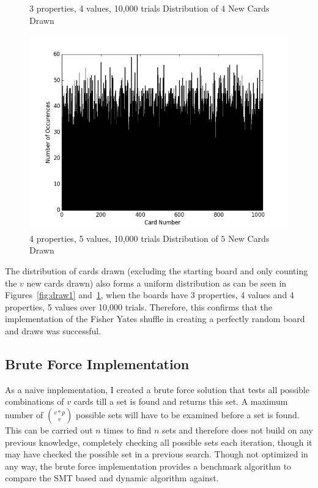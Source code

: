 \documentclass[pageno]{jpaper}
\begin{document}
\begin{figure}[htbb]
\begin{minipage}[b]{0.5\linewidth}
\caption{3 properties, 4 values, 10,000 trials Distribution of $4$ New Cards Drawn}
\label{fig:draw1}
\end{minipage}
\hspace{0.5cm}
\begin{minipage}[b]{0.5\linewidth}
\centering
\includegraphics[width=.75\linewidth]{4p5v10000Draw.png}
\caption{4 properties, 5 values, 10,000 trials Distribution of $5$ New Cards Drawn}
\label{fig:draw2}
\end{minipage}
\end{figure}


The distribution of cards drawn (excluding the starting board and only counting the $v$ new cards drawn) also forms a uniform distribution as can be seen in Figures~\ref{fig:draw1}  and~\ref{fig:draw2}, when the boards have 3 properties, 4 values and 4 properties, 5 values over 10,000 trials. Therefore, this confirms that the implementation of the Fisher Yates shuffle in creating a perfectly random board and draws was successful. 


\subsection{Brute Force Implementation}

As a naive implementation, I created a brute force solution that tests all possible combinations of $v$ cards till a set is found and returns this set. A maximum number of ${v*p}\choose{v}$ possible sets will have to be examined before a set is found. This can be carried out $n$ times to find $n$ sets and therefore does not build on any previous knowledge, completely checking all possible sets each iteration, though it may have checked the possible set in a previous search. Though not optimized in any way, the brute force implementation provides a benchmark algorithm to compare the SMT based and dynamic algorithm against. 
\end{document}

